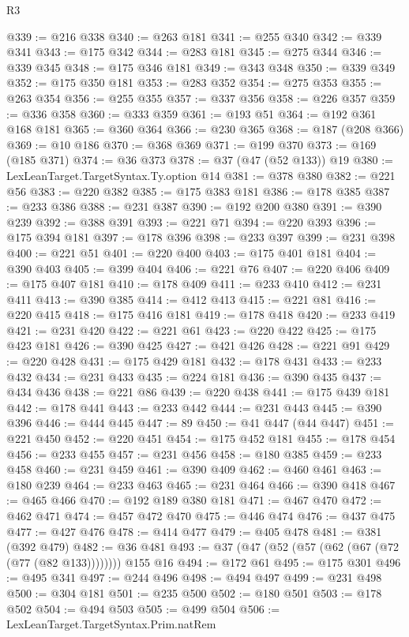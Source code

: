 \begin{lexlean}{R3}
\begin{coremodule}
@339 := @216 @338
@340 := @263 @181
@341 := @255 @340
@342 := @339 @341
@343 := @175 @342
@344 := @283 @181
@345 := @275 @344
@346 := @339 @345
@348 := @175 @346 @181
@349 := @343 @348
@350 := @339 @349
@352 := @175 @350 @181
@353 := @283 @352
@354 := @275 @353
@355 := @263 @354
@356 := @255 @355
@357 := @337 @356
@358 := @226 @357
@359 := @336 @358
@360 := @333 @359
@361 := @193 @51
@364 := @192 @361 @168 @181
@365 := @360 @364
@366 := @230 @365
@368 := @187 (@208 @366)
@369 := @10 @186
@370 := @368 @369
@371 := @199 @370
@373 := @169 (@185 @371)
@374 := @36 @373
@378 := @37 (@47 (@52 @133)) @19
@380 := LexLeanTarget.TargetSyntax.Ty.option @14
@381 := @378 @380
@382 := @221 @56
@383 := @220 @382
@385 := @175 @383 @181
@386 := @178 @385
@387 := @233 @386
@388 := @231 @387
@390 := @192 @200 @380
@391 := @390 @239
@392 := @388 @391
@393 := @221 @71
@394 := @220 @393
@396 := @175 @394 @181
@397 := @178 @396
@398 := @233 @397
@399 := @231 @398
@400 := @221 @51
@401 := @220 @400
@403 := @175 @401 @181
@404 := @390 @403
@405 := @399 @404
@406 := @221 @76
@407 := @220 @406
@409 := @175 @407 @181
@410 := @178 @409
@411 := @233 @410
@412 := @231 @411
@413 := @390 @385
@414 := @412 @413
@415 := @221 @81
@416 := @220 @415
@418 := @175 @416 @181
@419 := @178 @418
@420 := @233 @419
@421 := @231 @420
@422 := @221 @61
@423 := @220 @422
@425 := @175 @423 @181
@426 := @390 @425
@427 := @421 @426
@428 := @221 @91
@429 := @220 @428
@431 := @175 @429 @181
@432 := @178 @431
@433 := @233 @432
@434 := @231 @433
@435 := @224 @181
@436 := @390 @435
@437 := @434 @436
@438 := @221 @86
@439 := @220 @438
@441 := @175 @439 @181
@442 := @178 @441
@443 := @233 @442
@444 := @231 @443
@445 := @390 @396
@446 := @444 @445
@447 := 89
@450 := @41 @447 (@44 @447)
@451 := @221 @450
@452 := @220 @451
@454 := @175 @452 @181
@455 := @178 @454
@456 := @233 @455
@457 := @231 @456
@458 := @180 @385
@459 := @233 @458
@460 := @231 @459
@461 := @390 @409
@462 := @460 @461
@463 := @180 @239
@464 := @233 @463
@465 := @231 @464
@466 := @390 @418
@467 := @465 @466
@470 := @192 @189 @380 @181
@471 := @467 @470
@472 := @462 @471
@474 := @457 @472 @470
@475 := @446 @474
@476 := @437 @475
@477 := @427 @476
@478 := @414 @477
@479 := @405 @478
@481 := @381 (@392 @479)
@482 := @36 @481
@493 := @37 (@47 (@52 (@57 (@62 (@67 (@72 (@77 (@82 @133)))))))) @155 @16
@494 := @172 @61
@495 := @175 @301
@496 := @495 @341
@497 := @244 @496
@498 := @494 @497
@499 := @231 @498
@500 := @304 @181
@501 := @235 @500
@502 := @180 @501
@503 := @178 @502
@504 := @494 @503
@505 := @499 @504
@506 := LexLeanTarget.TargetSyntax.Prim.natRem

\end{coremodule}
\end{lexlean}
